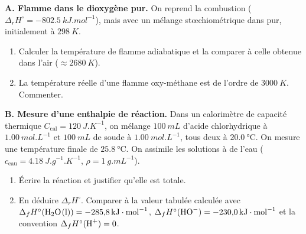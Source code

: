 \label{exo:gaz}
\textbf{A. Flamme dans le dioxygène pur.} On reprend la combustion  ($\Delta_rH^\circ = \SI{-802,5}{kJ.mol^{-1}}$), mais avec un mélange stœchiométrique dans  pur, initialement à $\SI{298}{K}$.
\begin{enumerate}
  \item Calculer la température de flamme adiabatique et la comparer à celle obtenue dans l'air ($\approx\SI{2680}{K}$).
  \item La température réelle d'une flamme oxy-méthane est de l'ordre de $\SI{3000}{K}$. Commenter.
\end{enumerate}
\textbf{B. Mesure d'une enthalpie de réaction.} Dans un calorimètre de capacité thermique $C_{\text{cal}} = \SI{120}{J.K^{-1}}$, on mélange $\SI{100}{mL}$ d'acide chlorhydrique à $\SI{1,00}{mol.L^{-1}}$ et $\SI{100}{mL}$ de soude à $\SI{1,00}{mol.L^{-1}}$, tous deux à $\SI{20,0}{\celsius}$. On mesure une température finale de $\SI{25,8}{\celsius}$. On assimile les solutions à de l'eau ($c_{\text{eau}} = \SI{4,18}{J.g^{-1}.K^{-1}}$, $\rho = \SI{1}{g.mL^{-1}}$).
\begin{enumerate}[resume]
  \item Écrire la réaction et justifier qu'elle est totale.
  \item En déduire $\Delta_rH^\circ$. Comparer à la valeur tabulée calculée avec $\Delta_fH^\circ(\ce{H2O(l)}) = \SI{-285,8}{kJ.mol^{-1}}$, $\Delta_fH^\circ(\ce{HO-}) = \SI{-230,0}{kJ.mol^{-1}}$ et la convention $\Delta_fH^\circ(\ce{H+}) = 0$.
\end{enumerate}

